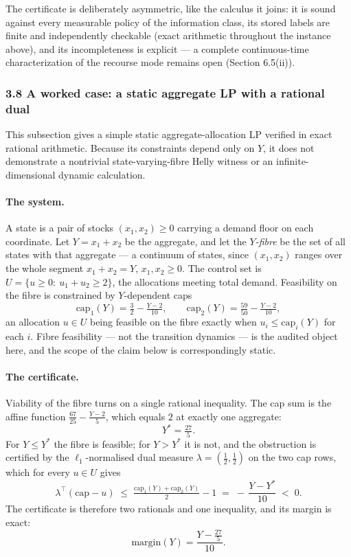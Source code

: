 \documentclass[10pt,twocolumn]{article}
\theoremstyle{definition}
\begin{document}
The certificate is deliberately asymmetric, like the calculus it joins: it is
sound against every measurable policy of the information class, its stored
labels are finite and independently checkable (exact arithmetic throughout the
instance above), and its incompleteness is explicit --- a complete
continuous-time characterization of the recourse mode remains open
(Section 6.5(ii)).

\subsubsection{3.8 A worked case: a static aggregate LP with a rational dual}
\label{calc-worked-case}

This subsection gives a simple static aggregate-allocation LP verified
in exact rational arithmetic. Because its constraints depend only on
\(Y\), it does not demonstrate a nontrivial state-varying-fibre
Helly witness or an infinite-dimensional dynamic calculation.

\paragraph{The system.} A state is a pair of stocks \((x_1,x_2)\ge 0\) carrying a demand
floor on each coordinate. Let \(Y=x_1+x_2\) be the aggregate, and let the \emph{\(Y\)-fibre}
be the set of all states with that aggregate --- a continuum of states, since
\((x_1,x_2)\) ranges over the whole segment \(x_1+x_2=Y\), \(x_1,x_2\ge 0\). The control set
is \(U=\{u\ge 0:\ u_1+u_2\ge 2\}\), the allocations meeting total demand. Feasibility on the
fibre is constrained by \(Y\)-dependent caps
\[
\mathrm{cap}_1(Y)=\tfrac32-\tfrac{Y-2}{10},\qquad
\mathrm{cap}_2(Y)=\tfrac{59}{50}-\tfrac{Y-2}{10},
\]
an allocation \(u\in U\) being feasible on the fibre exactly when \(u_i\le\mathrm{cap}_i(Y)\)
for each \(i\). Fibre feasibility --- not the transition dynamics --- is the audited object
here, and the scope of the claim below is correspondingly static.

\paragraph{The certificate.} Viability of the fibre turns on a single rational inequality.
The cap sum is the affine function \(\tfrac{67}{25}-\tfrac{Y-2}{5}\), which equals \(2\) at
exactly one aggregate:
\[
Y^{*}=\tfrac{27}{5}.
\]
For \(Y\le Y^{*}\) the fibre is feasible; for \(Y>Y^{*}\) it is not, and the obstruction is
certified by the \(\ell_1\)-normalised dual measure \(\lambda=(\tfrac12,\tfrac12)\) on the two
cap rows, which for every \(u\in U\) gives
\[
\lambda^{\top}(\mathrm{cap}-u)\;\le\;\tfrac{\mathrm{cap}_1(Y)+\mathrm{cap}_2(Y)}{2}-1
\;=\;-\,\frac{Y-Y^{*}}{10}\;<\;0 .
\]
The certificate is therefore two rationals and one inequality, and its margin is exact:
\[
\mathrm{margin}(Y)=\frac{Y-\tfrac{27}{5}}{10}.
\]
\end{document}
